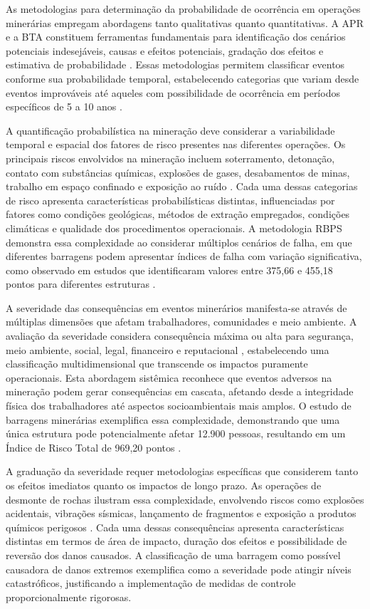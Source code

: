 As metodologias para determinação da probabilidade de ocorrência em operações minerárias empregam abordagens tanto qualitativas quanto quantitativas. A APR e a BTA constituem ferramentas fundamentais para identificação dos cenários potenciais indesejáveis, causas e efeitos potenciais, gradação dos efeitos e estimativa de probabilidade \cite{vilaca2021}. Essas metodologias permitem classificar eventos conforme sua probabilidade temporal, estabelecendo categorias que variam desde eventos improváveis até aqueles com possibilidade de ocorrência em períodos específicos de 5 a 10 anos \cite{vilaca2021}.

A quantificação probabilística na mineração deve considerar a variabilidade temporal e espacial dos fatores de risco presentes nas diferentes operações. Os principais riscos envolvidos na mineração incluem soterramento, detonação, contato com substâncias químicas, explosões de gases, desabamentos de minas, trabalho em espaço confinado e exposição ao ruído \cite{vendrame2023}. Cada uma dessas categorias de risco apresenta características probabilísticas distintas, influenciadas por fatores como condições geológicas, métodos de extração empregados, condições climáticas e qualidade dos procedimentos operacionais. A metodologia RBPS demonstra essa complexidade ao considerar múltiplos cenários de falha, em que diferentes barragens podem apresentar índices de falha com variação significativa, como observado em estudos que identificaram valores entre 375,66 e 455,18 pontos para diferentes estruturas \cite{conceicao2018}.

A severidade das consequências em eventos minerários manifesta-se através de múltiplas dimensões que afetam trabalhadores, comunidades e meio ambiente. A avaliação da severidade considera consequência máxima ou alta para segurança, meio ambiente, social, legal, financeiro e reputacional \cite{vilaca2021}, estabelecendo uma classificação multidimensional que transcende os impactos puramente operacionais. Esta abordagem sistêmica reconhece que eventos adversos na mineração podem gerar consequências em cascata, afetando desde a integridade física dos trabalhadores até aspectos socioambientais mais amplos. O estudo de barragens minerárias exemplifica essa complexidade, demonstrando que uma única estrutura pode potencialmente afetar 12.900 pessoas, resultando em um Índice de Risco Total de 969,20 pontos \cite{conceicao2018}.

A graduação da severidade requer metodologias específicas que considerem tanto os efeitos imediatos quanto os impactos de longo prazo. As operações de desmonte de rochas ilustram essa complexidade, envolvendo riscos como explosões acidentais, vibrações sísmicas, lançamento de fragmentos e exposição a produtos químicos perigosos \cite{vendrame2023}. Cada uma dessas consequências apresenta características distintas em termos de área de impacto, duração dos efeitos e possibilidade de reversão dos danos causados. A classificação de uma barragem como possível causadora de danos extremos \cite{conceicao2018} exemplifica como a severidade pode atingir níveis catastróficos, justificando a implementação de medidas de controle proporcionalmente rigorosas.


